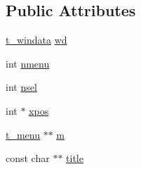 \subsection*{\-Public \-Attributes}
\begin{DoxyCompactItemize}
\item 
\hyperlink{structt__windata}{t\-\_\-windata} \hyperlink{structt__pulldown_aac01816fa249ef0cea5c871ba65a89d6}{wd}
\item 
int \hyperlink{structt__pulldown_af85e79851a77e094bd037a0a3bdc2701}{nmenu}
\item 
int \hyperlink{structt__pulldown_aed4fe57ed6793b00bd7e72afa5dc8078}{nsel}
\item 
int $\ast$ \hyperlink{structt__pulldown_a4eebb0122cb0248582ac42ded2ec33e1}{xpos}
\item 
\hyperlink{structt__menu}{t\-\_\-menu} $\ast$$\ast$ \hyperlink{structt__pulldown_a1010909c723a4d9cfc8bf2c83afcf4b2}{m}
\item 
const char $\ast$$\ast$ \hyperlink{structt__pulldown_ace380adf9cd9773e993f7ece6db5547a}{title}
\end{DoxyCompactItemize}


